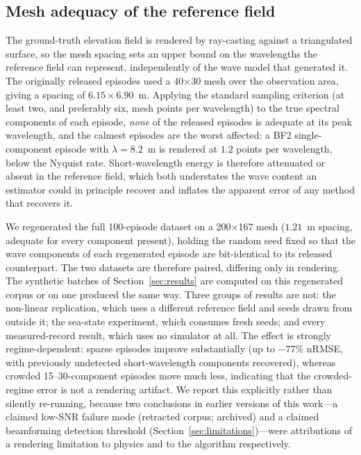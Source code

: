 \documentclass[review]{elsarticle}
\begin{document}
\subsection{Mesh adequacy of the reference field}
\label{sec:regen}

The ground-truth elevation field is rendered by ray-casting against a
triangulated surface, so the mesh spacing sets an upper bound on the
wavelengths the reference field can represent, independently of the
wave model that generated it.  The originally released episodes used a
40$\times$30 mesh over the observation area, giving a spacing of
$6.15 \times 6.90$~m.  Applying the standard sampling criterion
(at least two, and preferably six, mesh points per wavelength) to the
true spectral components of each episode, \emph{none} of the released
episodes is adequate at its peak wavelength, and the calmest episodes
are the worst affected: a BF2 single-component episode with
$\lambda = 8.2$~m is rendered at $1.2$ points per wavelength, below
the Nyquist rate.  Short-wavelength energy is therefore attenuated or
absent in the reference field, which both understates the wave content
an estimator could in principle recover and inflates the apparent error
of any method that recovers it.

We regenerated the full 100-episode dataset on a 200$\times$167 mesh
($1.21$~m spacing, adequate for every component present), holding the
random seed fixed so that the wave components of each regenerated
episode are bit-identical to its released counterpart.  The two
datasets are therefore paired, differing only in rendering.
The synthetic batches of Section~\ref{sec:results} are computed on this regenerated
corpus or on one produced the same way. Three groups of results are not: the
non-linear replication, which uses a different reference field and seeds drawn from
outside it; the sea-state experiment, which consumes fresh seeds; and every
measured-record result, which uses no simulator at all.  The effect is strongly regime-dependent: sparse episodes
improve substantially (up to $-77\%$ nRMSE, with previously undetected
short-wavelength components recovered), whereas crowded
15--30-component episodes move much less, indicating that the
crowded-regime error is not a rendering artifact.  We report this
explicitly rather than silently re-running, because two conclusions in
earlier versions of this work---a claimed low-SNR failure mode
(retracted corpus; archived) and a claimed beamforming detection
threshold (Section~\ref{sec:limitations})---were attributions of a
rendering limitation to physics and to the algorithm respectively.
\end{document}
